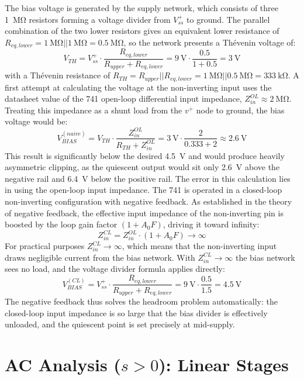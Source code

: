 The bias voltage is generated by the supply network, which consists of three \SI{1}{\mega\ohm} resistors forming a voltage divider from \(V_{ss}^{+}\) to ground.
The parallel combination of the two lower resistors gives an equivalent lower resistance of \(R_{eq,lower} = \SI{1}{\mega\ohm}  ||  \SI{1}{\mega\ohm} = \SI{0.5}{\mega\ohm}\), so the network presents a Thévenin voltage of:
\[
V_{TH} = V_{ss}^{+} \cdot \frac{R_{eq,lower}}{R_{upper} + R_{eq,lower}} = \SI{9}{\volt} \cdot \frac{0.5}{1 + 0.5} = \SI{3}{\volt}
\]
with a Thévenin resistance of \(R_{TH} = R_{upper}  ||  R_{eq,lower} = \SI{1}{\mega\ohm}  ||  \SI{0.5}{\mega\ohm} = \SI{333}{\kilo\ohm}\).
A first attempt at calculating the voltage at the non-inverting input uses the datasheet value of the 741 open-loop differential input impedance, \(Z_{in}^{OL} \approx \SI{2}{\mega\ohm}\).
Treating this impedance as a shunt load from the \(v^+\) node to ground, the bias voltage would be:
\[
V_{BIAS}^{(naive)} = V_{TH} \cdot \frac{Z_{in}^{OL}}{R_{TH} + Z_{in}^{OL}} = \SI{3}{\volt} \cdot \frac{2}{0.333 + 2} \approx \SI{2.6}{\volt}
\]
This result is significantly below the desired \SI{4.5}{\volt} and would produce heavily asymmetric clipping, as the quiescent output would sit only \SI{2.6}{\volt} above the negative rail and \SI{6.4}{\volt} below the positive rail.
The error in this calculation lies in using the open-loop input impedance.
The 741 is operated in a closed-loop non-inverting configuration with negative feedback.
As established in the theory of negative feedback, the effective input impedance of the non-inverting pin is boosted by the loop gain factor \((1 + A_0 F)\), driving it toward infinity:
\[
Z_{in}^{CL} = Z_{in}^{OL} \cdot (1 + A_0 F) \to \infty
\]
For practical purposes \(Z_{in}^{CL} \to \infty\), which means that the non-inverting input draws negligible current from the bias network.
With \(Z_{in}^{CL} \to \infty\) the bias network sees no load, and the voltage divider formula applies directly:
\[
V_{BIAS}^{(CL)} = V_{ss}^{+} \cdot \frac{R_{eq,lower}}{R_{upper} + R_{eq,lower}} = \SI{9}{\volt} \cdot \frac{0.5}{1.5} = \SI{4.5}{\volt}
\]
The negative feedback thus solves the headroom problem automatically: the closed-loop input impedance is so large that the bias divider is effectively unloaded, and the quiescent point is set precisely at mid-supply.

\section{AC Analysis (\texorpdfstring{\(s > 0\)}{s>0}): Linear Stages}
\label{sc:33}

